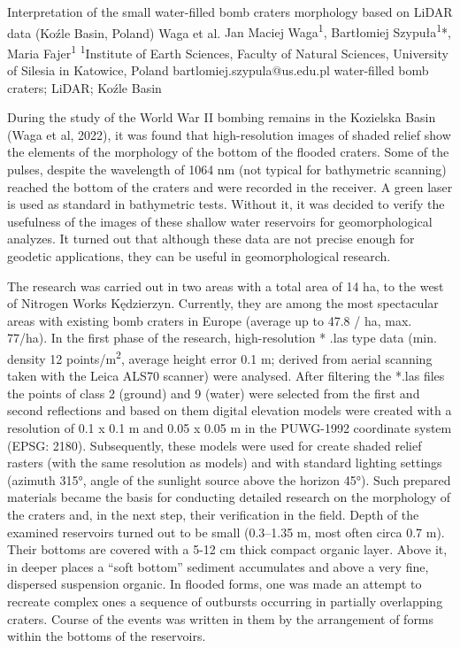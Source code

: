 \abstract
{Interpretation of the small water-filled bomb craters morphology based on LiDAR data (Koźle Basin, Poland)} 
{Waga et al.} 
{Jan Maciej Waga\textsuperscript{1}, Bartłomiej Szypuła\textsuperscript{1}*, Maria Fajer\textsuperscript{1}} 
{\POtag} 
{
		\textsuperscript{1}Institute of Earth Sciences, Faculty of Natural Sciences, University of Silesia in Katowice, Poland
}
{bartlomiej.szypula@us.edu.pl}  %
{water-filled bomb craters; LiDAR; Koźle Basin}
{
During the study of the World War II bombing remains in the Kozielska Basin (Waga et al, 2022), it was found that high-resolution images of shaded relief show the elements of the morphology of the bottom of the flooded craters. Some of the pulses, despite the wavelength of 1064 nm (not typical for bathymetric scanning) reached the bottom of the craters and were recorded in the receiver. A green laser is used as standard in bathymetric tests. Without it, it was decided to verify the usefulness of the images of these shallow water reservoirs for geomorphological analyzes. It turned out that although these data are not precise enough for geodetic applications, they can be useful in geomorphological research.

The research was carried out in two areas with a total area of 14 ha, to the west of Nitrogen Works Kędzierzyn. Currently, they are among the most spectacular areas with existing bomb craters in Europe (average up to 47.8 / ha, max. 77/ha). In the first phase of the research, high-resolution * .las type data (min. density 12 points/m\textsuperscript{2}, average height error 0.1 m; derived from aerial scanning taken with the Leica ALS70 scanner) were analysed. After filtering the *.las files the points of class 2 (ground) and 9 (water) were selected from the first and second reflections and based on them digital elevation models were created with a resolution of 0.1 x 0.1 m and 0.05 x 0.05 m in the PUWG-1992 coordinate system (EPSG: 2180). Subsequently, these models were used for create shaded relief rasters (with the same resolution as models) and with standard lighting settings (azimuth 315°, angle of the sunlight source above the horizon 45°). Such prepared materials became the basis for conducting detailed research on the morphology of the craters and, in the next step, their verification in the field. Depth of the examined reservoirs turned out to be small (0.3--1.35 m, most often circa 0.7 m). Their bottoms are covered with a 5-12 cm thick compact organic layer. Above it, in deeper places a \enquote{soft bottom} sediment accumulates and above a very fine, dispersed suspension organic. In flooded forms, one was made an attempt to recreate complex ones a sequence of outbursts occurring in partially overlapping craters. Course of the events was written in them by the arrangement of forms within the bottoms of the reservoirs. 

}
